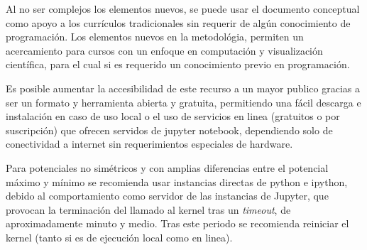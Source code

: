 \documentclass{article}
\begin{document}
Al no ser complejos los elementos nuevos, se puede usar el documento conceptual como apoyo a los currículos tradicionales sin requerir de algún conocimiento de programación. Los elementos nuevos en la metodológia, permiten un acercamiento para cursos con un enfoque en computación y visualización científica, para el cual si es requerido un conocimiento previo en programación.

Es posible aumentar la accesibilidad de este recurso a un mayor publico gracias a ser un formato y herramienta abierta y gratuita, permitiendo una fácil descarga e instalación en caso de uso local o el uso de servicios en linea (gratuitos o por suscripción) que ofrecen servidos de jupyter notebook, dependiendo solo de conectividad a internet sin requerimientos especiales de hardware.

Para potenciales no simétricos y con amplias diferencias entre el potencial máximo y mínimo se recomienda usar instancias directas de python e ipython, debido al comportamiento como servidor de las instancias de Jupyter, que provocan la terminación del llamado al kernel tras un \textit{timeout}, de aproximadamente minuto y medio. Tras este periodo se recomienda reiniciar el kernel (tanto si es de ejecución local como en linea).









\end{document}
